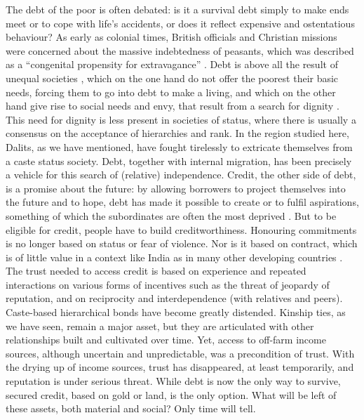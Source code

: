 \documentclass[a4paper, 11pt, onecolumn]{article}
\begin{document}
The debt of the poor is often debated: is it a survival debt simply to make ends meet or to cope with life's accidents, or does it reflect expensive and ostentatious behaviour? As early as colonial times, British officials and Christian missions were concerned about the massive indebtedness of peasants, which was described as a ``congenital propensity for extravagance'' \citep[p.167]{Pouchepadass1980}. Debt is above all the result of unequal societies \citep{UN2020}, which on the one hand do not offer the poorest their basic needs, forcing them to go into debt to make a living, and which on the other hand give rise to social needs and envy, that result from a search for dignity \citep{Servet2013}. This need for dignity is less present in societies of status, where there is usually a consensus on the acceptance of hierarchies and rank. In the region studied here, Dalits, as we have mentioned, have fought tirelessly to extricate themselves from a caste status society. Debt, together with internal migration, has been precisely a vehicle for this search of (relative) independence. Credit, the other side of debt, is a promise about the future: by allowing borrowers to project themselves into the future and to hope, debt has made it possible to create or to fulfil aspirations, something of which the subordinates are often the most deprived \citep{Appadurai2004}. But to be eligible for credit, people have to build creditworthiness. Honouring commitments is no longer based on status or fear of violence. Nor is it based on contract, which is of little value in a context like India \citep{Harriss-White2003} as in many other developing countries \citep{Platteau1994}. The trust needed to access credit is based on experience and repeated interactions \citep{Hilger2020} on various forms of incentives such as the threat of jeopardy of reputation, and on reciprocity and interdependence (with relatives and peers). Caste-based hierarchical bonds have become greatly distended. Kinship ties, as we have seen, remain a major asset, but they are articulated with other relationships built and cultivated over time. Yet, access to off-farm income sources, although uncertain and unpredictable, was a precondition of trust. With the drying up of income sources, trust has disappeared, at least temporarily, and reputation is under serious threat. While debt is now the only way to survive, secured credit, based on gold or land, is the only option.  What will be left of these assets, both material and social? Only time will tell.
\end{document}
